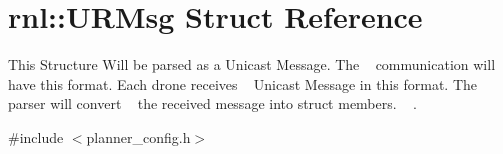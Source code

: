 \hypertarget{structrnl_1_1URMsg}{}\section{rnl\+:\+:U\+R\+Msg Struct Reference}
\label{structrnl_1_1URMsg}


This Structure Will be parsed as a Unicast Message. The ~\newline
communication will have this format. Each drone receives ~\newline
Unicast Message in this format. The parser will convert ~\newline
the received message into struct members. ~\newline
.  




{\ttfamily \#include $<$planner\+\_\+config.\+h$>$}

